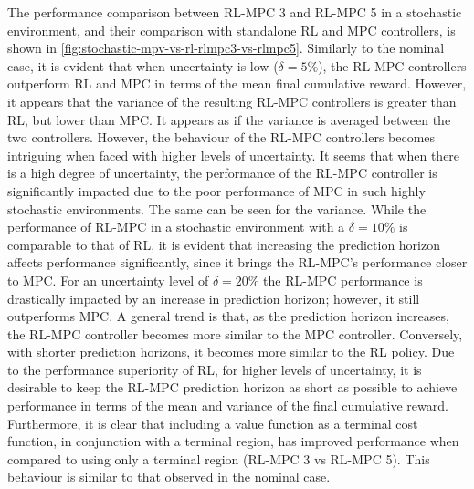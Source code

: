 The performance comparison between RL-MPC 3 and RL-MPC 5 in a stochastic environment, and their comparison with standalone RL and MPC controllers, is shown in \autoref{fig:stochastic-mpv-vs-rl-rlmpc3-vs-rlmpc5}. Similarly to the nominal case, it is evident that when uncertainty is low ($\delta = 5\%$), the RL-MPC controllers outperform RL and MPC in terms of the mean final cumulative reward. However, it appears that the variance of the resulting RL-MPC controllers is greater than RL, but lower than MPC. It appears as if the variance is averaged between the two controllers. 
However, the behaviour of the RL-MPC controllers becomes intriguing when faced with higher levels of uncertainty. It seems that when there is a high degree of uncertainty, the performance of the RL-MPC controller is significantly impacted due to the poor performance of MPC in such highly stochastic environments. The same can be seen for the variance. While the performance of RL-MPC in a stochastic environment with a $\delta = 10\%$  is comparable to that of RL, it is evident that increasing the prediction horizon affects performance significantly, since it brings the RL-MPC's performance closer to MPC. For an uncertainty level of $\delta = 20\%$ the RL-MPC performance is drastically impacted by an increase in prediction horizon; however, it still outperforms MPC. A general trend is that, as the prediction horizon increases, the RL-MPC controller becomes more similar to the MPC controller. Conversely, with shorter prediction horizons, it becomes more similar to the RL policy. Due to the performance superiority of RL, for higher levels of uncertainty, it is desirable to keep the RL-MPC prediction horizon as short as possible to achieve performance in terms of the mean and variance of the final cumulative reward. Furthermore, it is clear that including a value function as a terminal cost function, in conjunction with a terminal region, has improved performance when compared to using only a terminal region (RL-MPC 3 vs RL-MPC 5). This behaviour is similar to that observed in the nominal case.

